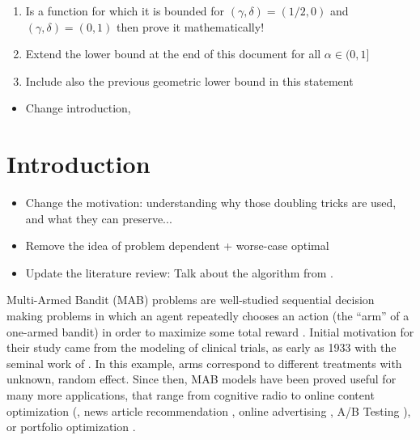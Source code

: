 \documentclass[12pt]{colt2018} %
\begin{document}
\begin{enumerate}
    \item Is a function for which it is bounded for $(\gamma,\delta)=(1/2,0)$ and $(\gamma,\delta)=(0,1)$ then prove it mathematically!
    \item Extend the lower bound at the end of this document for all $\alpha \in (0,1]$
    \item Include also the previous geometric lower bound in this statement
\end{enumerate}

\begin{itemize}
    \item Change introduction,
\end{itemize}


\section{Introduction}

    \begin{itemize}
        \item
        Change the motivation:
        understanding why those doubling tricks are used, and what they can preserve...
        \item
        Remove the idea of problem dependent + worse-case optimal
        \item
        Update the literature review:
        Talk about the \KLUCBswitch{} algorithm from \cite{Garivier18}.
    \end{itemize}

Multi-Armed Bandit (MAB) problems are well-studied sequential decision making problems in which an agent repeatedly chooses an action (the ``arm'' of a one-armed bandit) in order to maximize some total reward \citep{Robbins52,LaiRobbins85}.
Initial motivation for their study came from the modeling of clinical trials, as early as 1933 with the seminal work of \cite{Thompson33}.
In this example, arms correspond to different treatments with unknown, random effect.
Since then, MAB models have been proved useful for many more applications, that range from
cognitive radio \citep{Jouini09} to
online content optimization (\eg, news article recommendation \citep{Li10}, online advertising \citep{LiChapelle11}, A/B Testing \citep{Kaufmann14,Jamieson17ABTest}),
or portfolio optimization \citep{Sani2012risk}.
\end{document}
